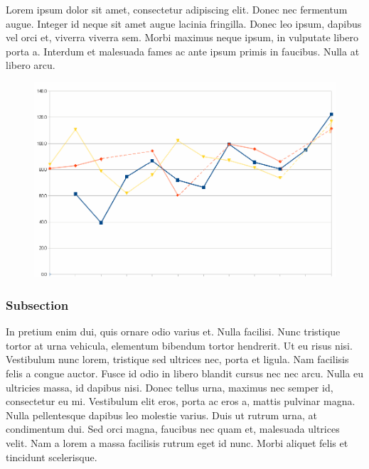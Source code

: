 \documentclass[10,a4paperpaper,]{article}
\begin{document}
Lorem ipsum dolor sit amet, consectetur adipiscing elit. Donec nec
fermentum augue. Integer id neque sit amet augue lacinia fringilla.
Donec leo ipsum, dapibus vel orci et, viverra viverra sem. Morbi maximus
neque ipsum, in vulputate libero porta a. Interdum et malesuada fames ac
ante ipsum primis in faucibus. Nulla at libero arcu.

\begin{figure}[htb]
  \centering
  \includegraphics[width=1\textwidth]{figures/figure1.png}
  \centering
\end{figure}

\subsubsection{Subsection}

In pretium enim dui, quis ornare odio varius et. Nulla facilisi. Nunc
tristique tortor at urna vehicula, elementum bibendum tortor hendrerit.
Ut eu risus nisi. Vestibulum nunc lorem, tristique sed ultrices nec,
porta et ligula. Nam facilisis felis a congue auctor. Fusce id odio in
libero blandit cursus nec nec arcu. Nulla eu ultricies massa, id dapibus
nisi. Donec tellus urna, maximus nec semper id, consectetur eu mi.
Vestibulum elit eros, porta ac eros a, mattis pulvinar magna. Nulla
pellentesque dapibus leo molestie varius. Duis ut rutrum urna, at
condimentum dui. Sed orci magna, faucibus nec quam et, malesuada
ultrices velit. Nam a lorem a massa facilisis rutrum eget id nunc. Morbi
aliquet felis et tincidunt scelerisque.
\end{document}

